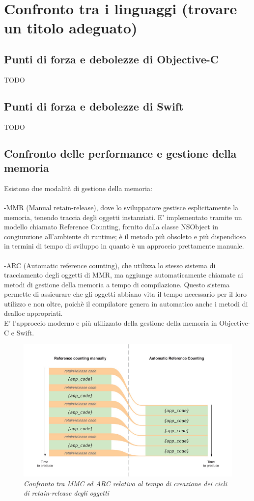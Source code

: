 \chapter{Confronto tra i linguaggi (trovare un titolo adeguato)}

\section{Punti di forza e debolezze di Objective-C}
TODO
\section{Punti di forza e debolezze di Swift}
TODO
\section{Confronto delle performance e gestione della memoria}
Esistono due modalità di gestione della memoria:\\
\\-MMR (Manual retain-release), dove lo sviluppatore gestisce esplicitamente la memoria, tenendo traccia degli oggetti instanziati. E' implementato tramite un modello chiamato Reference Counting, fornito dalla classe NSObject in congiunzione all'ambiente di runtime; è il metodo più obsoleto e più dispendioso in termini di tempo di sviluppo in quanto è un approccio prettamente manuale.\\
\\-ARC (Automatic reference counting), che utilizza lo stesso sistema di tracciamento degli oggetti di MMR, ma aggiunge automaticamente chiamate ai metodi di gestione della memoria a tempo di compilazione. Questo sistema permette di assicurare che gli oggetti abbiano vita il tempo necessario per il loro utilizzo e non oltre, poichè il compilatore genera in automatico anche i metodi di dealloc appropriati.\\E' l'approccio moderno e più utilizzato della gestione della memoria in Objective-C e Swift.
\begin{figure}[H]
      \centering
      \includegraphics[scale=0.40]{immagini/ARC.jpg}
            \vspace{0.8cm}
            \caption{\textit{Confronto tra MMC ed ARC relativo al tempo di creazione dei cicli di retain-release degli oggetti}}
    \end{figure}
